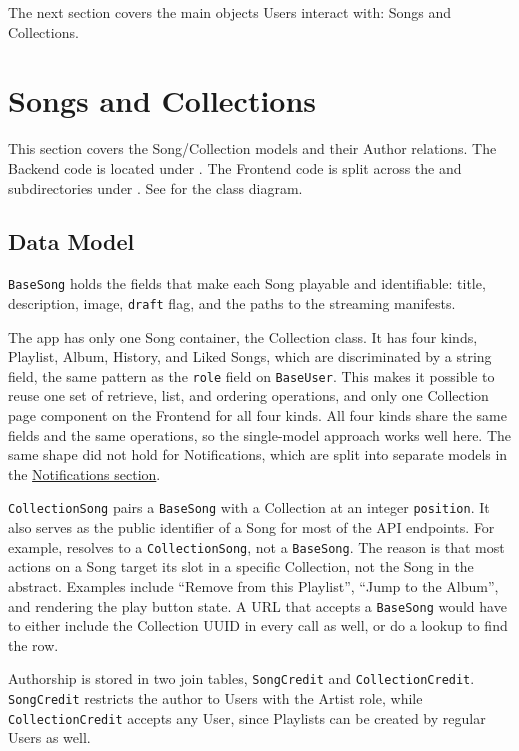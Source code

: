 The next section covers the main objects Users interact with:
Songs and Collections.


\section{Songs and Collections}\label{sec:songs_collections}
This section covers the Song/Collection models and their Author relations.
The Backend code is located under .
The Frontend code is split across the 
and  subdirectories
under .
See  for the class diagram.

\subsection{Data Model}
\texttt{BaseSong} holds the fields that make each Song playable and
identifiable: title, description, image, \texttt{draft} flag, and the
paths to the streaming manifests.

The app has only one Song container, the Collection class. It has
four kinds, Playlist, Album, History, and Liked Songs, which are
discriminated by a string field, the same pattern as the
\texttt{role} field on \texttt{BaseUser}. This makes it possible to
reuse one set of retrieve, list, and ordering operations, and only
one Collection page component on the Frontend for all four kinds.
All four kinds share the same fields and the same operations, so the
single-model approach works well here. The same shape did not hold
for Notifications, which are split into separate models in the
\hyperref[sec:notifications]{Notifications section}.

\texttt{CollectionSong} pairs a \texttt{BaseSong} with a Collection at
an integer \texttt{position}. It also serves as the public identifier
of a Song for most of the API endpoints. For example,
 resolves to a \texttt{CollectionSong}, not a
\texttt{BaseSong}. The reason is that most actions on a Song target
its slot in a specific Collection, not the Song in the abstract.
Examples include ``Remove from this Playlist'', ``Jump to the Album'',
and rendering the play button state. A URL that accepts a
\texttt{BaseSong} would have to either include the Collection UUID in
every call as well, or do a lookup to find the row.

Authorship is stored in two join tables, \texttt{SongCredit} and
\texttt{CollectionCredit}. \texttt{SongCredit} restricts the
author to Users with the Artist role, while \texttt{CollectionCredit}
accepts any User, since Playlists can be created by regular Users as well.

